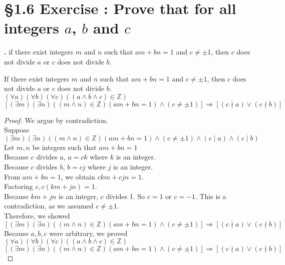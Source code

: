 \documentclass[a4paper,11pt]{article}
\begin{document}
\section*{\S 1.6 Exercise : Prove that for all integers \(a\), \(b\) and \(c\)}
\textbf{.}
if there exist integers \(m\) and \(n\) such that \(am+bn=1\) and \(c \neq \pm 
1\), then \(c\) does not divide \(a\) or \(c\) does not divide \(b\).
\begin{theorem3}
If there exist integers \(m\) and \(n\) such that \(am+bn=1\) and \(c \neq \pm 
1\), then \(c\) does not divide \(a\) or \(c\) does not divide \(b\).\\
\((\forall a)(\forall b)(\forall c)((a\wedge b \wedge c)\in \mathbb{Z}) \)\\
\([(\exists m)(\exists n)((m\wedge n)\in \mathbb{Z})(am+bn=1)\wedge(c\neq \pm 1)]\Rightarrow [(c \nmid a)\vee (c \nmid b)] \)
\begin{proof}
  We argue by contradiction.\\
  Suppose \((\exists m)(\exists n)((m\wedge n)\in \mathbb{Z})(am+bn=1)\wedge(c\neq \pm 1)\wedge (c \mid a)\wedge (c \mid b) 
  \)\\
  Let \(m, n\) be integers such that \(am+bn=1\)\\
  Because \(c\) divides \(a\), \(a=ck\) where \(k\) is an integer.\\
  Because \(c\) divides \(b\), \(b=cj\) where \(j\) is an integer.\\
  From \(am+bn=1\), we obtain \(ckm+cjn=1\).\\
  Factoring \(c, c(km+jn)=1.\)\\
  Because \(km+jn\) is an integer, \(c\) divides 1. So \(c=1\) or \(c=-1\). This is a contradiction, as we assumed \(c \neq \pm 1\).\\
  Therefore, we showed\\ \([(\exists m)(\exists n)((m\wedge n)\in \mathbb{Z})(am+bn=1)\wedge(c\neq \pm 1)]\Rightarrow [(c \nmid a)\vee (c \nmid b)] 
  \)\\
  Because \(a,b,c\) were arbitrary, we proved\\
  \((\forall a)(\forall b)(\forall c)((a\wedge b \wedge c)\in \mathbb{Z}) \)\\
\([(\exists m)(\exists n)((m\wedge n)\in \mathbb{Z})(am+bn=1)\wedge(c\neq \pm 1)]\Rightarrow [(c \nmid a)\vee (c \nmid b)] \)
\end{proof}
\end{theorem3}
\end{document}
